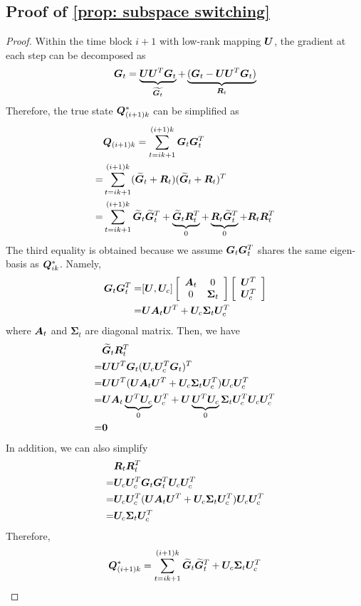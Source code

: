 \subsection{Proof of \cref{prop: subspace switching}}
\label{subapp: proof subspace switching}
\begin{proof}
    Within the time block $i+1$ with low-rank mapping ${\bm{U}}$, the gradient at each step can be decomposed as 
    \begin{align*}
        {\bm{G}}_t = \underbrace{{\bm{U}}{\bm{U}}^T{\bm{G}}_t}_{\widetilde{{\bm{G}}_t}} + \underbrace{({\bm{G}}_t - {\bm{U}}{\bm{U}}^T{\bm{G}}_t)}_{{\bm{R}}_t}
    \end{align*}
    Therefore, the true state ${\bm{Q}}^*_{(i+1)k}$ can be simplified as 
    \begin{align*}
        & {\bm{Q}}_{(i+1)k} = \sum_{t=ik+1}^{(i+1)k}{\bm{G}}_t{\bm{G}}_t^T\\
        =& \sum_{t=ik+1}^{(i+1)k} (\widetilde{{\bm{G}}}_t+{\bm{R}}_t)(\widetilde{{\bm{G}}}_t+{\bm{R}}_t)^T\\
        =& \sum_{t=ik+1}^{(i+1)k} \widetilde{{\bm{G}}}_t\widetilde{{\bm{G}}}_t^T+ \underbrace{\widetilde{{\bm{G}}}_t{\bm{R}}_t^T}_{0}+ \underbrace{{\bm{R}}_t\widetilde{{\bm{G}}}_t^T}_{0} + {\bm{R}}_t{\bm{R}}_t^T
    \end{align*}
The third equality is obtained because we assume ${\bm{G}}_t{\bm{G}}_t^T$ shares the same eigen-basis as ${\bm{Q}}^*_{ik}$. Namely, 
\begin{align*}
{\bm{G}}_t{\bm{G}}_t^T=&[{\bm{U}},{\bm{U}}_c]\left[\begin{array}{cc}
    {\bm{A}}_{t} & 0 \\
   0  & \bm{\Sigma}_t
\end{array}\right]\left[\begin{array}{c}
     {\bm{U}}^T  \\
     {\bm{U}}_c^T
\end{array}\right]\\
=& {\bm{U}}{\bm{A}}_t{\bm{U}}^T + {\bm{U}}_c\bm{\Sigma}_t{\bm{U}}_c^T
\end{align*}
where ${\bm{A}}_t$ and $\bm{\Sigma}_t$ are diagonal matrix. Then, we have
\begin{align*}
    &\widetilde{{\bm{G}}}_t{\bm{R}}_t^T\\
    =& {\bm{U}}{\bm{U}}^T{\bm{G}}_t({\bm{U}}_c{\bm{U}}_c^T{\bm{G}}_t)^T\\
    =& {\bm{U}}{\bm{U}}^T({\bm{U}}{\bm{A}}_t{\bm{U}}^T+{\bm{U}}_c\bm{\Sigma}_t{\bm{U}}_c^T){\bm{U}}_c{\bm{U}}_c^T\\
    =& {\bm{U}}{\bm{A}}_t\underbrace{{\bm{U}}^T{\bm{U}}_c}_{0}{\bm{U}}_c^T + {\bm{U}}\underbrace{{\bm{U}}^T{\bm{U}}_c}_{0}\bm{\Sigma}_t{\bm{U}}_c^T{\bm{U}}_c{\bm{U}}_c^T\\
    =&\bm{0}
\end{align*}
In addition, we can also simplify
\begin{align*}
    &{\bm{R}}_t{\bm{R}}_t^T\\
    =& {\bm{U}}_c{\bm{U}}_c^T{\bm{G}}_t{\bm{G}}_t^T{\bm{U}}_c{\bm{U}}_c^T\\
    =& {\bm{U}}_c{\bm{U}}_c^T({\bm{U}}{\bm{A}}_t{\bm{U}}^T+{\bm{U}}_c\bm{\Sigma}_t{\bm{U}}_c^T){\bm{U}}_c{\bm{U}}_c^T\\
    =&{\bm{U}}_c\bm{\Sigma}_t{\bm{U}}_c^T
\end{align*}
Therefore, 
\begin{align*}
    {\bm{Q}}^*_{(i+1)k} = \sum_{t=ik+1}^{(i+1)k} \widetilde{{\bm{G}}}_t\widetilde{{\bm{G}}}_t^T + {\bm{U}}_c\bm{\Sigma}_t{\bm{U}}_c^T
\end{align*}
\end{proof}


